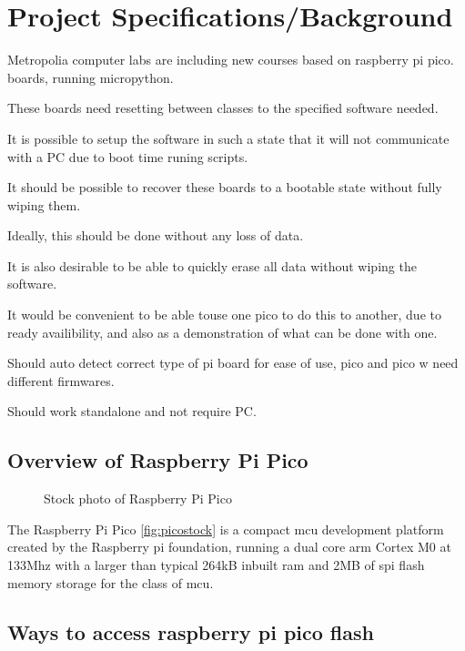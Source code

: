 \clearpage%
\vspace{21.5pt}
\chapter{Project Specifications/Background}

Metropolia computer labs are including new courses based on raspberry pi pico. boards, running micropython.

These boards need resetting between classes to the specified software needed.

It is possible to setup the software in such a state that it will not communicate with a PC due to boot time runing scripts.

It should be possible to recover these boards to a bootable state without fully wiping them.

Ideally, this should be done without any loss of data.

It is also desirable to be able to quickly erase all data without wiping the software.

It would be convenient to be able touse one pico to do this to another, due to ready availibility, and also as a demonstration of what can be done with one.

Should auto detect correct type of pi board for ease of use, pico and pico w need different firmwares.

Should work standalone and not require PC.
\clearpage
\section{Overview of Raspberry Pi Pico}

\begin{figure}[ht]
	\centering
	\caption{Stock photo of Raspberry Pi Pico}
	\label{fig:picostock}
\end{figure}

The Raspberry Pi Pico \autoref{fig:picostock} is a compact \gls{mcu} development platform created by the Raspberry pi foundation, running a dual core \gls{arm} Cortex M0 at 133Mhz with a larger than typical 264kB inbuilt \gls{ram} and 2MB of \gls{spi} flash memory storage for the class of \gls{mcu}\cite{ltdBuyRaspberryPi}.

\clearpage
\section{Ways to access raspberry pi pico flash}

